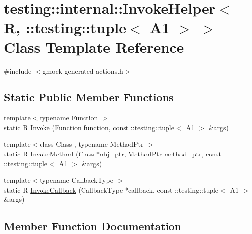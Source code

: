 \hypertarget{classtesting_1_1internal_1_1_invoke_helper_3_01_r_00_01_1_1testing_1_1tuple_3_01_a1_01_4_01_4}{}\section{testing\+::internal\+::Invoke\+Helper$<$ R, \+::testing\+::tuple$<$ A1 $>$ $>$ Class Template Reference}
\label{classtesting_1_1internal_1_1_invoke_helper_3_01_r_00_01_1_1testing_1_1tuple_3_01_a1_01_4_01_4}


{\ttfamily \#include $<$gmock-\/generated-\/actions.\+h$>$}

\subsection*{Static Public Member Functions}
\begin{DoxyCompactItemize}
\item 
{\footnotesize template$<$typename Function $>$ }\\static R \mbox{\hyperlink{classtesting_1_1internal_1_1_invoke_helper_3_01_r_00_01_1_1testing_1_1tuple_3_01_a1_01_4_01_4_a162b9783d4904f5f45d4e677299cab0d}{Invoke}} (\mbox{\hyperlink{structtesting_1_1internal_1_1_function}{Function}} function, const \+::testing\+::tuple$<$ A1 $>$ \&args)
\item 
{\footnotesize template$<$class Class , typename Method\+Ptr $>$ }\\static R \mbox{\hyperlink{classtesting_1_1internal_1_1_invoke_helper_3_01_r_00_01_1_1testing_1_1tuple_3_01_a1_01_4_01_4_a320389ba7ab6458aeb70c07a2c9e061b}{Invoke\+Method}} (Class $\ast$obj\+\_\+ptr, Method\+Ptr method\+\_\+ptr, const \+::testing\+::tuple$<$ A1 $>$ \&args)
\item 
{\footnotesize template$<$typename Callback\+Type $>$ }\\static R \mbox{\hyperlink{classtesting_1_1internal_1_1_invoke_helper_3_01_r_00_01_1_1testing_1_1tuple_3_01_a1_01_4_01_4_a15660d8fb6fe6ec6b2e030fed772548e}{Invoke\+Callback}} (Callback\+Type $\ast$callback, const \+::testing\+::tuple$<$ A1 $>$ \&args)
\end{DoxyCompactItemize}


\subsection{Member Function Documentation}
\mbox{\label{classtesting_1_1internal_1_1_invoke_helper_3_01_r_00_01_1_1testing_1_1tuple_3_01_a1_01_4_01_4_a162b9783d4904f5f45d4e677299cab0d}} 
